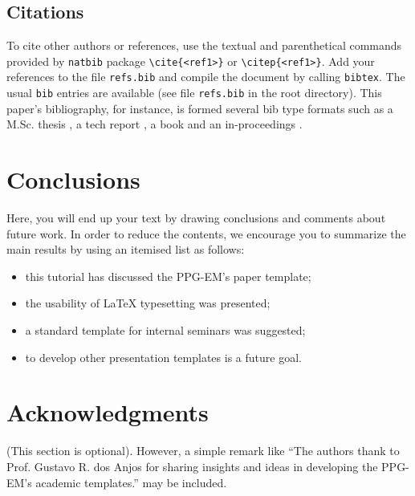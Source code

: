 \documentclass[date,twocolumn,a4paper]{ppgem}
\begin{document}
\subsection{Citations}

To cite other authors or references, use the textual and parenthetical
commands provided by \verb|natbib| package \verb|\cite{<ref1>}| or
\verb|\citep{<ref1>}|. Add your references to the file \verb|refs.bib|
and compile the document by calling \verb|bibtex|. The usual \verb|bib|
entries are available (see file \verb|refs.bib| in the root directory).
This paper's bibliography, for instance, is formed several bib type
formats such as a M.Sc. thesis \citep{rabellomsc2007}, a tech report
\cite{amarante2001}, a book \citep{batchelor1994} and  an in-proceedings
\cite{lima2009}.

\section{Conclusions}

Here, you will end up your text by drawing conclusions and comments
about future work. In order to reduce the contents, we encourage you to
summarize the main results by using an itemised list as follows:

\begin{itemize}
 \item this tutorial has discussed the PPG-EM's paper template;
 \item the usability of {\LaTeX} typesetting was presented;
 \item a standard template for internal seminars was suggested;
 \item to develop other presentation templates is a future goal. 
\end{itemize}

\section{Acknowledgments}

(This section is optional). However, a simple remark like ``The authors
thank to Prof. Gustavo R. dos Anjos for sharing insights and ideas in
developing the PPG-EM's academic templates.'' may be included. 



\end{document}
